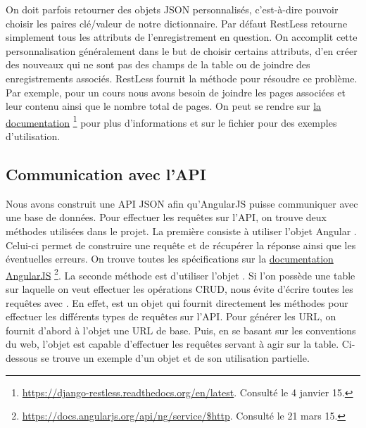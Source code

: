 \documentclass[a4paper,10pt,twoside]{sphinxmanual}
\begin{document}
On doit parfois retourner des objets JSON personnalisés, c'est-à-dire pouvoir choisir les paires clé/valeur de notre dictionnaire. Par défaut RestLess retourne simplement tous les attributs de l'enregistrement en question. On accomplit cette personnalisation généralement dans le but de choisir certains attributs, d'en créer des nouveaux qui ne sont pas des champs de la table ou de joindre des enregistrements associés. RestLess fournit la méthode  pour résoudre ce problème. Par exemple, pour un cours nous avons besoin de joindre les pages associées et leur contenu ainsi que le nombre total de pages. On peut se rendre sur \href{https://django-restless.readthedocs.org/en/latest/\#}{la documentation} \footnote{
\href{https://django-restless.readthedocs.org/en/latest}{https://django-restless.readthedocs.org/en/latest}. Consulté le 4 janvier 15.
} pour plus d'informations et sur le fichier  pour des exemples d'utilisation.


\subsection{Communication avec l'API}
\label{restless:communication-avec-l-api}
Nous avons construit une API JSON afin qu'AngularJS puisse communiquer avec une base de données. Pour effectuer les requêtes sur l'API, on trouve deux méthodes utilisées dans le projet. La première consiste à utiliser l'objet Angular . Celui-ci permet de construire une requête et de récupérer la réponse ainsi que les éventuelles erreurs. On trouve toutes les spécifications sur la \href{https://docs.angularjs.org/api/ng/service/\$http}{documentation AngularJS} \footnote{
\href{https://docs.angularjs.org/api/ng/service/\$http}{https://docs.angularjs.org/api/ng/service/\$http}. Consulté le 21 mars 15.
}. La seconde méthode est d'utiliser l'objet . Si l'on possède une table sur laquelle on veut effectuer les opérations CRUD,  nous évite d'écrire toutes les requêtes avec . En effet,  est un objet qui fournit directement les méthodes pour effectuer les différents types de requêtes sur l'API. Pour générer les URL, on fournit d'abord à l'objet une URL de base. Puis, en se basant sur les conventions du web, l'objet est capable d'effectuer les requêtes servant à agir sur la table. Ci-dessous se trouve un exemple d'un objet  et de son utilisation partielle.
\end{document}
